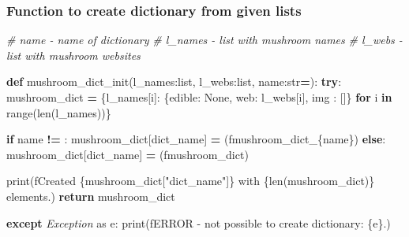 \documentclass[
]{article}
\newenvironment{Shaded}{\begin{snugshade}}{\end{snugshade}}
\newcommand{\BuiltInTok}[1]{#1}
\newcommand{\CommentTok}[1]{\textcolor[rgb]{0.56,0.35,0.01}{\textit{#1}}}
\newcommand{\ControlFlowTok}[1]{\textcolor[rgb]{0.13,0.29,0.53}{\textbf{#1}}}
\newcommand{\ImportTok}[1]{#1}
\newcommand{\KeywordTok}[1]{\textcolor[rgb]{0.13,0.29,0.53}{\textbf{#1}}}
\newcommand{\NormalTok}[1]{#1}
\newcommand{\OperatorTok}[1]{\textcolor[rgb]{0.81,0.36,0.00}{\textbf{#1}}}
\newcommand{\PreprocessorTok}[1]{\textcolor[rgb]{0.56,0.35,0.01}{\textit{#1}}}
\newcommand{\SpecialCharTok}[1]{\textcolor[rgb]{0.00,0.00,0.00}{#1}}
\newcommand{\SpecialStringTok}[1]{\textcolor[rgb]{0.31,0.60,0.02}{#1}}
\newcommand{\StringTok}[1]{\textcolor[rgb]{0.31,0.60,0.02}{#1}}
\newcommand{\VariableTok}[1]{\textcolor[rgb]{0.00,0.00,0.00}{#1}}
\begin{document}
\hypertarget{function-to-create-dictionary-from-given-lists}{%
\subsubsection{Function to create dictionary from given
lists}\label{function-to-create-dictionary-from-given-lists}}

\begin{Shaded}
\begin{Highlighting}[]
\CommentTok{\# name {-} name of dictionary}
\CommentTok{\# l\_names {-} list with mushroom names}
\CommentTok{\# l\_webs {-} list with mushroom websites}

\KeywordTok{def}\NormalTok{ mushroom\_dict\_init(l\_names:}\BuiltInTok{list}\NormalTok{, l\_webs:}\BuiltInTok{list}\NormalTok{, name:}\BuiltInTok{str}\OperatorTok{=}\StringTok{\textquotesingle{}\textquotesingle{}}\NormalTok{):}
    \ControlFlowTok{try}\NormalTok{:}
\NormalTok{        mushroom\_dict }\OperatorTok{=}\NormalTok{ \{l\_names[i]: \{}\StringTok{\textquotesingle{}edible\textquotesingle{}}\NormalTok{: }\VariableTok{None}\NormalTok{, }\StringTok{\textquotesingle{}web\textquotesingle{}}\NormalTok{: l\_webs[i], }\StringTok{\textquotesingle{}img\textquotesingle{}}\NormalTok{ : []\} }\ControlFlowTok{for}\NormalTok{ i }\KeywordTok{in} \BuiltInTok{range}\NormalTok{(}\BuiltInTok{len}\NormalTok{(l\_names))\}}

        \ControlFlowTok{if}\NormalTok{ name }\OperatorTok{!=} \StringTok{\textquotesingle{}\textquotesingle{}}\NormalTok{:}
\NormalTok{            mushroom\_dict[}\StringTok{\textquotesingle{}dict\_name\textquotesingle{}}\NormalTok{] }\OperatorTok{=}\NormalTok{ (}\SpecialStringTok{f\textquotesingle{}mushroom\_dict\_}\SpecialCharTok{\{}\NormalTok{name}\SpecialCharTok{\}}\SpecialStringTok{\textquotesingle{}}\NormalTok{)}
        \ControlFlowTok{else}\NormalTok{:}
\NormalTok{            mushroom\_dict[}\StringTok{\textquotesingle{}dict\_name\textquotesingle{}}\NormalTok{] }\OperatorTok{=}\NormalTok{ (}\SpecialStringTok{f\textquotesingle{}mushroom\_dict\textquotesingle{}}\NormalTok{)}

        \BuiltInTok{print}\NormalTok{(}\SpecialStringTok{f\textquotesingle{}Created }\SpecialCharTok{\{}\NormalTok{mushroom\_dict[}\StringTok{"dict\_name"}\NormalTok{]}\SpecialCharTok{\}}\SpecialStringTok{ with }\SpecialCharTok{\{}\BuiltInTok{len}\NormalTok{(mushroom\_dict)}\SpecialCharTok{\}}\SpecialStringTok{ elements.\textquotesingle{}}\NormalTok{)}
        \ControlFlowTok{return}\NormalTok{ mushroom\_dict}

    \ControlFlowTok{except} \PreprocessorTok{Exception} \ImportTok{as}\NormalTok{ e:}
        \BuiltInTok{print}\NormalTok{(}\SpecialStringTok{f\textquotesingle{}ERROR {-} not possible to create dictionary: }\SpecialCharTok{\{}\NormalTok{e}\SpecialCharTok{\}}\SpecialStringTok{.\textquotesingle{}}\NormalTok{)}
\end{Highlighting}
\end{Shaded}
\end{document}
